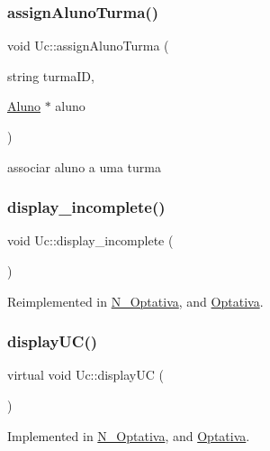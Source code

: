 \subsubsection{\texorpdfstring{assign\+Aluno\+Turma()}{assignAlunoTurma()}}
{\footnotesize\ttfamily void Uc\+::assign\+Aluno\+Turma (\begin{DoxyParamCaption}\item[{string}]{turma\+ID,  }\item[{\hyperlink{class_aluno}{Aluno} $\ast$}]{aluno }\end{DoxyParamCaption})}

associar aluno a uma turma \hypertarget{class_uc_a32e7d62a706731268ef22f5d0c76793f}{}\label{class_uc_a32e7d62a706731268ef22f5d0c76793f} 
\subsubsection{\texorpdfstring{display\+\_\+incomplete()}{display\_incomplete()}}
{\footnotesize\ttfamily void Uc\+::display\+\_\+incomplete (\begin{DoxyParamCaption}{ }\end{DoxyParamCaption})\hspace{0.3cm}{\ttfamily [virtual]}}



Reimplemented in \hyperlink{class_n___optativa_a11190901ff62b2d09903e81886d4cdd4}{N\+\_\+\+Optativa}, and \hyperlink{class_optativa_a6e8cf85b9ccacb15ad7a217f55120b9f}{Optativa}.

\hypertarget{class_uc_a9a64416600c67469a285d97a20050dd4}{}\label{class_uc_a9a64416600c67469a285d97a20050dd4} 
\subsubsection{\texorpdfstring{display\+U\+C()}{displayUC()}}
{\footnotesize\ttfamily virtual void Uc\+::display\+UC (\begin{DoxyParamCaption}{ }\end{DoxyParamCaption})\hspace{0.3cm}{\ttfamily [pure virtual]}}



Implemented in \hyperlink{class_n___optativa_a91df0bfdec2f9fd86ccf3f83d23dff4d}{N\+\_\+\+Optativa}, and \hyperlink{class_optativa_a48019eb60424bdad456c22c7c7656082}{Optativa}.

